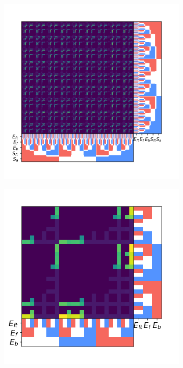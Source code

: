 \documentclass{article}
\begin{document}
\begin{figure}[htbp]
  \centering
  \begin{subfigure}[b]{0.5\textwidth}
    \vspace{0pt} %
    \centering
    \includegraphics[width=\textwidth]{../plots/scatter2.png}
    \caption{}
    \label{fig:fitnessPlot2}
  \end{subfigure}%
  \hspace{-15pt}%
  \begin{subfigure}[b]{0.5\textwidth}
    \vspace{0pt} %
    \centering
    \includegraphics[width=\textwidth]{../plots/scatter2WorkingPattern.png}

\end{subfigure}
\end{figure}
\end{document}

